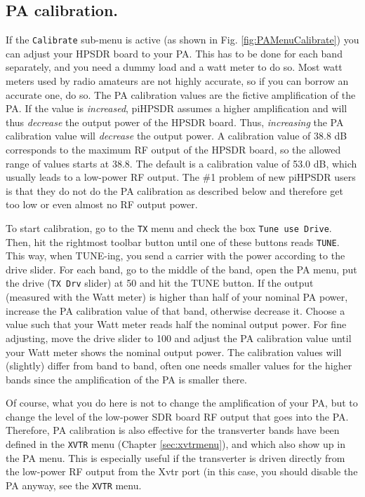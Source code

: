 \documentclass[12pt]{book}
\def\rett#1{\texttt{\color{red}#1}}
\def\bltt#1{\texttt{\color{blue}#1}}
\def\pH{pi\-HPSDR\xspace}
\begin{document}
\subsection{PA calibration.}
If the \rett{Calibrate} sub-menu is active
(as shown in Fig. \ref{fig:PAMenuCalibrate}) you can adjust your
HPSDR board to your PA. This has to be done for each band separately,
and you need a dummy load and a watt meter to do so. Most watt meters
used by radio amateurs are not highly accurate, so if you can borrow
an accurate one, do so. The PA calibration values are the fictive
amplification of the PA. If the value is \textit{increased},
\pH assumes a higher amplification and will thus \textit{decrease}
the output power of the HPSDR board. Thus, \textit{increasing} the
PA calibration value will \textit{decrease} the output power. A calibration
value of 38.8 dB corresponds to the maximum RF output of the HPSDR board,
so the allowed range of values starts at 38.8. The default is a calibration
value of 53.0 dB, which usually leads to a low-power RF output. The \#1
problem of new \pH users is that they do not do the PA calibration as described
below and therefore get too low or even almost no RF output power.

To start calibration, go to the \bltt{TX} menu and check the
box \rett{Tune use Drive}. Then, hit the rightmost toolbar button
until one of these buttons reads \bltt{TUNE}. This way, when
TUNE-ing, you send a carrier with the power according to the drive
slider. For each band, go to the middle of the band, open the PA
menu, put the drive (\rett{TX Drv} slider) at 50 and hit the TUNE button. If the
output (measured with the Watt meter) is higher than half
of your nominal PA power, increase the
PA calibration value of that band, otherwise decrease it. Choose
a value such that your Watt meter reads half the nominal output
power. For fine adjusting, move the drive slider to 100 and
adjust the PA calibration value until your Watt meter shows the
nominal output  power. The calibration values will  (slightly)
differ from band to band, often one needs smaller values for the
higher bands since the amplification of the PA is smaller there.

Of course, what you do here is not to change the amplification of
your PA, but to change the level of the low-power SDR board RF
output that goes into the PA. Therefore, PA calibration is also
effective for the
transverter bands have been defined in the \bltt{XVTR} menu
(Chapter \ref{sec:xvtrmenu}), and
which also show up in the PA menu. This is especially useful if
the transverter is driven directly from the low-power RF output
from the Xvtr port (in this case, you should disable the PA
anyway, see the \bltt{XVTR} menu.
\end{document}
